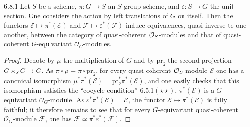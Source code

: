 \begin{proposition}{6.8.1}\label{I.6.8.1}
Let \(S\) be a scheme, \(\pi\colon G\to S\) an \(S\)-group scheme, and
\(\varepsilon\colon S\to G\) the unit section. One considers the action by
left translations of \(G\) on itself. Then the functors
\(\mathcal{E}\mapsto\pi^{*}(\mathcal{E})\) and
\(\mathcal{F}\mapsto\varepsilon^{*}(\mathcal{F})\) induce equivalences,
quasi-inverse to one another, between the category of quasi-coherent
\(\mathcal{O}_S\)-modules and that of quasi-coherent \(G\)-equivariant
\(\mathcal{O}_{G}\)-modules.
\end{proposition}

\begin{proof}
Denote by \(\mu\) the multiplication of \(G\) and by \(\mathrm{pr}_{2}\) the
second projection \(G\times_{S}G\to G\). As \(\pi\circ\mu=\pi\circ\mathrm{pr}_{2}\),
for every quasi-coherent \(\mathcal{O}_S\)-module \(\mathcal{E}\) one has a canonical
isomorphism \(\mu^{*}\pi^{*}(\mathcal{E})=\mathrm{pr}_{2}^{*}\pi^{*}(\mathcal{E})\),
and one easily checks that this isomorphism satisfies the ``cocycle
condition'' 6.5.1\((\star\star)\), \ie \(\pi^{*}(\mathcal{E})\) is a
\(G\)-equivariant \(\mathcal{O}_{G}\)-module. As
\(\varepsilon^{*}\pi^{*}(\mathcal{E})=\mathcal{E}\), the functor
\(\mathcal{E}\mapsto\pi^{*}(\mathcal{E})\) is fully faithful; it therefore
remains to see that for every \(G\)-equivariant quasi-coherent
\(\mathcal{O}_{G}\)-module \(\mathcal{F}\), one has
\(\mathcal{F}\simeq\pi^{*}\varepsilon^{*}(\mathcal{F})\).
\renewcommand{\qedsymbol}{}
\end{proof}
